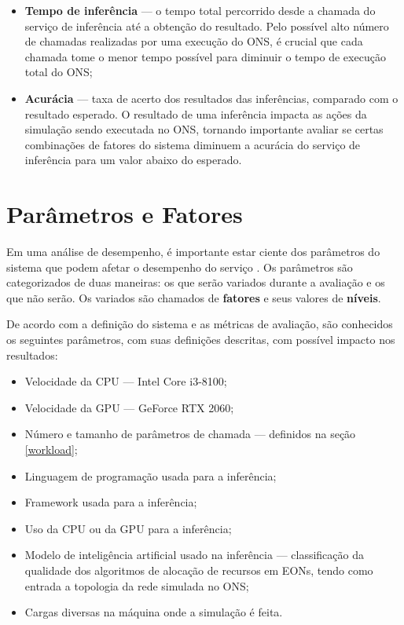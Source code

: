 \begin{itemize}
  \item \textbf{Tempo de inferência} — o tempo total percorrido desde a chamada do serviço de inferência até a obtenção do resultado. Pelo possível alto número de chamadas realizadas por uma execução do ONS, é crucial que cada chamada tome o menor tempo possível para diminuir o tempo de execução total do ONS;
  \item \textbf{Acurácia} — taxa de acerto dos resultados das inferências, comparado com o resultado esperado. O resultado de uma inferência impacta as ações da simulação sendo executada no ONS, tornando importante avaliar se certas combinações de fatores do sistema diminuem a acurácia do serviço de inferência para um valor abaixo do esperado.
\end{itemize}

\section{Parâmetros e Fatores}
\label{paramsfactors}

Em uma análise de desempenho, é importante estar ciente dos parâmetros do sistema que podem afetar o desempenho do serviço \cite{jain1991art}. Os parâmetros são categorizados de duas maneiras: os que serão variados durante a avaliação e os que não serão. Os variados são chamados de \textbf{fatores} e seus valores de \textbf{níveis}.

De acordo com a definição do sistema e as métricas de avaliação, são conhecidos os seguintes parâmetros, com suas definições descritas, com possível impacto nos resultados:

\begin{itemize}
  \item Velocidade da CPU — Intel Core i3-8100;
  \item Velocidade da GPU — GeForce RTX 2060;
  \item Número e tamanho de parâmetros de chamada — definidos na seção \ref{workload};
  \item Linguagem de programação usada para a inferência;
  \item Framework usada para a inferência;
  \item Uso da CPU ou da GPU para a inferência;
  \item Modelo de inteligência artificial usado na inferência — classificação da qualidade dos algoritmos de alocação de recursos em EONs, tendo como entrada a topologia da rede simulada no ONS;
  \item Cargas diversas na máquina onde a simulação é feita.
\end{itemize}

